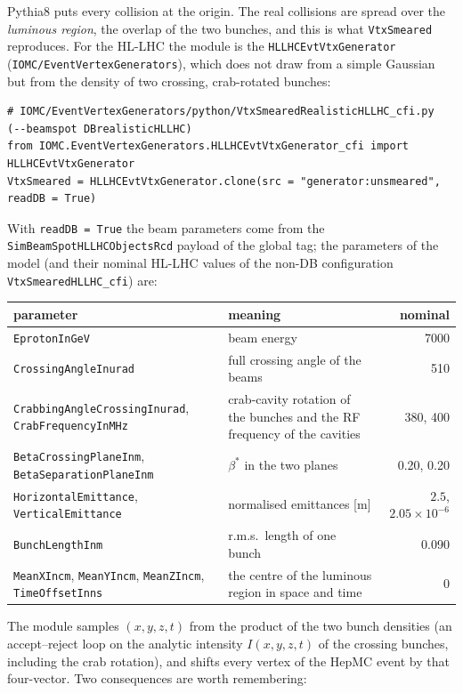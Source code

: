\documentclass[11pt,a4paper]{article}
\newcommand{\code}[1]{\texttt{#1}}
\begin{document}
Pythia8 puts every collision at the origin. The real collisions are spread over the \emph{luminous region},
the overlap of the two bunches, and this is what \code{VtxSmeared} reproduces. For the HL-LHC the module
is the \code{HLLHCEvtVtxGenerator} (\code{IOMC/EventVertexGenerators}), which does not draw from a simple
Gaussian but from the density of two crossing, crab-rotated bunches:
\begin{lstlisting}[style=py]
# IOMC/EventVertexGenerators/python/VtxSmearedRealisticHLLHC_cfi.py  (--beamspot DBrealisticHLLHC)
from IOMC.EventVertexGenerators.HLLHCEvtVtxGenerator_cfi import HLLHCEvtVtxGenerator
VtxSmeared = HLLHCEvtVtxGenerator.clone(src = "generator:unsmeared", readDB = True)
\end{lstlisting}
With \code{readDB = True} the beam parameters come from the \code{SimBeamSpotHLLHCObjectsRcd} payload of the
global tag; the parameters of the model (and their nominal HL-LHC values of the non-DB configuration
\code{VtxSmearedHLLHC\_cfi}) are:
\begin{center}\small
\begin{tabularx}{\textwidth}{>{\raggedright\arraybackslash}p{66mm}Xr}
\toprule
parameter & meaning & nominal \\
\midrule
\code{EprotonInGeV} & beam energy & 7000 \\
\code{CrossingAngleInurad} & full crossing angle of the beams & 510 \\
\code{CrabbingAngleCrossingInurad}, \code{CrabFrequencyInMHz} & crab-cavity rotation of the bunches and the RF
  frequency of the cavities & 380, 400 \\
\code{BetaCrossingPlaneInm}, \code{BetaSeparationPlaneInm} & $\beta^\ast$ in the two planes & 0.20, 0.20 \\
\code{HorizontalEmittance}, \code{VerticalEmittance} & normalised emittances [m] & $2.5$, $2.05\times10^{-6}$ \\
\code{BunchLengthInm} & r.m.s.\ length of one bunch & 0.090 \\
\code{MeanXIncm}, \code{MeanYIncm}, \code{MeanZIncm}, \code{TimeOffsetInns} & the centre of the luminous
  region in space and time & 0 \\
\bottomrule
\end{tabularx}
\end{center}
The module samples $(x, y, z, t)$ from the product of the two bunch densities (an accept--reject loop on the
analytic intensity $I(x,y,z,t)$ of the crossing bunches, including the crab rotation), and shifts every
vertex of the HepMC event by that four-vector. Two consequences are worth remembering:
\end{document}
